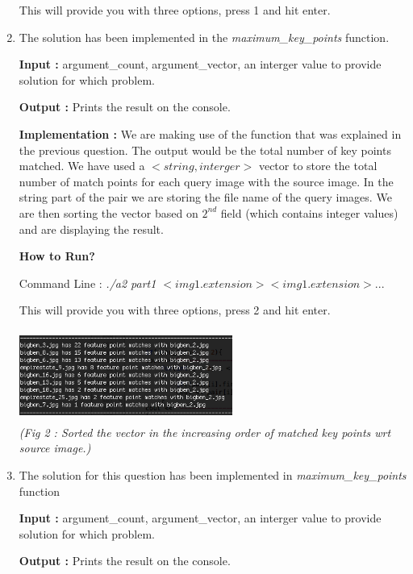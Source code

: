 \documentclass{article}
\begin{document}
\begin{enumerate}
		This will provide you with three options, press 1 and hit enter.
		
		
		\item 
		
		
		 The solution has been implemented in the \textit{maximum\_key\_points} function. 
		 
		\textbf{Input :} argument\_count, argument\_vector, an interger value to  provide solution for which problem. 
		
		\textbf{Output :} Prints the result on the console.
		
	\textbf{Implementation :} 
	We are making use of the function that was explained in the previous question. The output would be the total number of key points matched. We have used a $<string, interger>$ vector to store the total number of match points for each query image with the source image. In the string part of the pair we are storing the file name of the query images. We are then sorting the vector based on $2^{nd}$ field (which contains integer values) and are displaying the result.
		
			\textbf{How to Run?}
			
			Command Line : \textit{./a2 part1 $<img1.extension>  <img1.extension> ... $}
			
			This will provide you with three options, press 2 and hit enter.
				
				\begin{center}
					\includegraphics[height=3cm,width=7cm]{2} \\
					\textit{	(Fig 2 : Sorted the vector in the increasing order of matched key points wrt source image.)}
				\end{center}
			
			\item 
			
			The solution for this question has been implemented in \textit{maximum\_key\_points} function
			
			\textbf{Input :} argument\_count, argument\_vector, an interger value to  provide solution for which problem. 
			
			\textbf{Output :} Prints the result on the console.
			

\end{enumerate}
\end{document}
